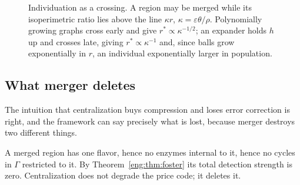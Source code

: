 \begin{figure}[t]
\centering
{}
\caption{Individuation as a crossing. A region may be merged while its
isoperimetric ratio lies above the line $\kappa r$, $\kappa =
\varepsilon\theta/\rho$. Polynomially growing graphs cross early and give
$r^\ast \propto \kappa^{-1/2}$; an expander holds $h$ up and crosses late,
giving $r^\ast \propto \kappa^{-1}$ and, since balls grow exponentially in
$r$, an individual exponentially larger in population.}
\label{eng:fig:crossing}
\end{figure}

\subsection{What merger deletes}\label{eng:S8.5}

The intuition that centralization buys compression and loses error
correction is right, and the framework can say precisely what is lost,
because merger destroys two different things.

\begin{proposition}[Merger sets $\bt = 0$]\label{eng:merger-sets-0}
A merged region has one flavor, hence no enzymes internal to it, hence no
cycles in $\Gamma$ restricted to it. By Theorem~\ref{eng:thm:foster} its total
detection strength is zero. Centralization does not degrade the price code;
it deletes it.
\end{proposition}

